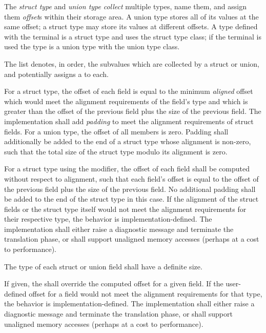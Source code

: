 \specsubsubitem
The \textit{struct type} and \textit{union type} \textit{collect} multiple
types, name them, and assign them \textit{offset}s within their storage area. A
union type stores all of its values at the same offset; a struct type may store
its values at different offsets. A type defined with the 
terminal is a struct type and uses the struct type class; if the
 terminal is used the type is a union type with the union type
class.

\specsubsubitem
The  list denotes, in order, the subvalues
which are collected by a struct or union, and potentially assigns a
 to each.

\specsubsubitem
For a struct type, the offset of each field is equal to the minimum
\textit{aligned} offset which would meet the alignment requirements of the
field's type and which is greater than the offset of the previous field plus the
size of the previous field. The implementation shall add \textit{padding} to
meet the alignment requirements of struct fields. For a union type, the offset
of all members is zero. Padding shall additionally be added to the end of a
struct type whose alignment is non-zero, such that the total size of the struct
type modulo its alignment is zero.

\specsubsubitem
For a struct type using the  modifier, the offset of each
field shall be computed without respect to alignment, such that each field's
offset is equal to the offset of the previous field plus the size of the
previous field. No additional padding shall be added to the end of the struct
type in this case. If the alignment of the struct fields or the struct type
itself would not meet the alignment requirements for their respective type, the
behavior is implementation-defined. The implementation shall either raise a
diagnostic message and terminate the translation phase, or shall support
unaligned memory accesses (perhaps at a cost to performance).

\specsubsubitem
The type of each struct or union field shall have a definite size.

\specsubsubitem
If given, the  shall override the computed offset
for a given field. If the user-defined offset for a field would not meet the
alignment requirements for that type, the behavior is implementation-defined.
The implementation shall either raise a diagnostic message and terminate the
translation phase, or shall support unaligned memory accesses (perhaps at a
cost to performance).

